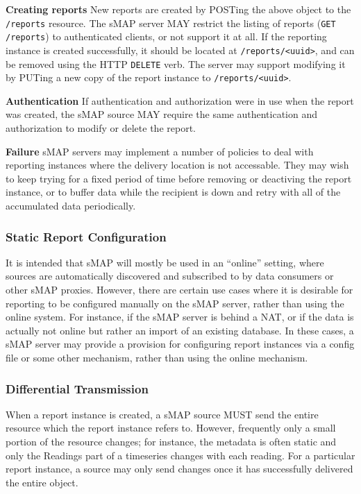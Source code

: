 \documentclass[10pt,letterpaper]{article}
\newcommand{\smap}{sMAP}
\begin{document}
{\bf Creating reports} New reports are created by POSTing the above object to
the {\tt /reports} resource.  The \smap{} server MAY restrict the listing of
reports ({\tt GET /reports}) to authenticated clients, or not support it at
all.  If the reporting instance is created successfully, it should be located
at {\tt /reports/<uuid>}, and can be removed using the HTTP {\tt DELETE} verb.
The server may support modifying it by PUTing a new copy of the report
instance to {\tt /reports/<uuid>}.

{\bf Authentication} If authentication and authorization were in use when the
report was created, the \smap{} source MAY require the same authentication and
authorization to modify or delete the report.

{\bf Failure} \smap{} servers may implement a number of policies to deal with
reporting instances where the delivery location is not accessable.  They may
wish to keep trying for a fixed period of time before removing or deactiving
the report instance, or to buffer data while the recipient is down and retry
with all of the accumulated data periodically.  

\subsubsection{Static Report Configuration}

It is intended that \smap{} will mostly be used in an ``online'' setting,
where sources are automatically discovered and subscribed to by data consumers
or other \smap{} proxies.  However, there are certain use cases where it is
desirable for reporting to be configured manually on the \smap{} server,
rather than using the online system.  For instance, if the \smap{} server is
behind a NAT, or if the data is actually not online but rather an import of an
existing database.  In these cases, a \smap{} server may provide a provision
for configuring report instances via a config file or some other mechanism,
rather than using the online mechanism.

\subsubsection{Differential Transmission}

When a report instance is created, a sMAP source MUST send the entire resource
which the report instance refers to.  However, frequently only a small portion
of the resource changes; for instance, the metadata is often static and only
the Readings part of a timeseries changes with each reading.  For a particular
report instance, a source may only send changes once it has successfully
delivered the entire object.  
\end{document}
